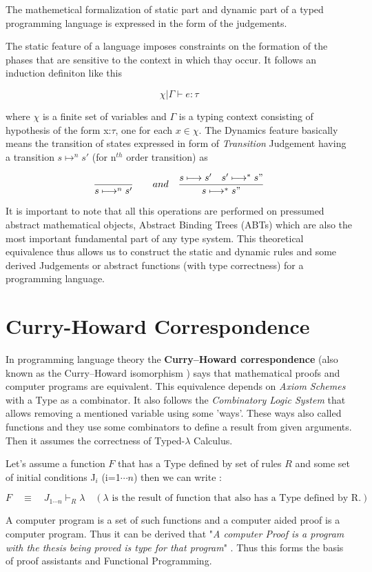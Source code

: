 The mathemetical formalization of static part and dynamic part of a typed programming language is expressed in the form of the judgements.

The static feature of a language imposes constraints on the formation of the phases that are sensitive to the context in which thay occur. It follows an induction definiton like this

\[\chi | \Gamma\vdash e:\tau\]

where $\chi$ is a finite set of variables and $\Gamma$ is a typing context consisting of hypothesis of the form x:$\tau$, one for each $x\in\chi$. The Dynamics feature basically means the transition of states expressed in form of \textit{Transition} Judgement having a transition $s\longmapsto^n s'$ (for n$^{th}$ order transition) as

\[\dfrac{}{s\longmapsto^n s'} \quad \quad and \quad \dfrac{{s\longmapsto s'} \quad {s'\longmapsto^{*} s"}}{s\longmapsto^{*} s"}  \]

It is important to note that all this operations are performed on pressumed abstract mathematical objects, Abstract Binding Trees (ABTs) which are also the most important fundamental part of any type system. This theoretical equivalence thus allows us to construct the static and dynamic rules and some derived Judgements or abstract functions (with type correctness) for a programming language.

\section{Curry-Howard Correspondence}
In programming language theory the \textbf{Curry–Howard correspondence} (also known as the Curry–Howard isomorphism ) says that mathematical proofs and computer programs are equivalent. This equivalence depends on \textit{Axiom Schemes} with a Type as a combinator. It also follows the \textit{Combinatory Logic System} that allows removing a mentioned variable using some 'ways'. These ways also called functions and they use some combinators to define a result from given arguments. Then it assumes the correctness of Typed-$\lambda$ Calculus. 

Let's assume a function $F$ that has a Type defined by set of rules $R$ and some set of initial conditions J$_i$ (i=1$\cdots n$) then we can write :

\[F \quad \equiv \quad J_{1 \cdots n}\vdash_R \lambda \quad (\lambda \mbox{ is the result of function that also has a Type defined by R.}) \]

A computer program is a set of such functions and a computer aided proof is a computer program. Thus it can be derived that "\textit{A computer Proof is a program with the thesis being proved is type for that program}" . Thus this forms the basis of proof assistants and Functional Programming. 
